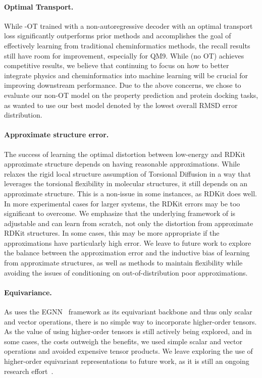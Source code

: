 \paragraph{Optimal Transport.} While \modelns-OT trained with a non-autoregressive decoder with an optimal transport loss significantly outperforms prior methods and accomplishes the goal of effectively learning from traditional cheminformatics methods, the recall results still have room for improvement, especially for QM9.
While \model (no OT) achieves competitive results, we believe that continuing to focus on how to better integrate physics and cheminformatics into machine learning will be crucial for improving downstream performance. Due to the above concerns, we chose to evaluate our non-OT model on the property prediction and protein docking tasks, as wanted to use our best model denoted by the lowest overall RMSD error distribution.


\paragraph{Approximate structure error.} 
The success of learning the optimal distortion between low-energy and RDKit approximate structure depends on having reasonable approximations.
While \model relaxes the rigid local structure assumption of Torsional Diffusion in a way that leverages the torsional flexibility in molecular structures, it still depends on an approximate structure. This is a non-issue in some instances, as RDKit does well. In more experimental cases for larger systems, the RDKit errors may be too significant to overcome. 
We emphasize that the underlying framework of \model is adjustable and can learn from scratch, not only the distortion from approximate RDKit structures. In some cases, this may be more appropriate if the approximations have particularly high error. 
We leave to future work to explore the balance between the approximation error and the inductive bias of learning from approximate structures, as well as methods to maintain flexibility while avoiding the issues of conditioning on out-of-distribution poor approximations.

\paragraph{Equivariance.} As \model uses the EGNN~\citep{EGNN} framework as its equivariant backbone and thus only scalar and vector operations, there is no simple way to incorporate higher-order tensors. As the value of using higher-order tensors is still actively being explored, and in some cases, the costs outweigh the benefits, we used simple scalar and vector operations and avoided expensive tensor products.
We leave exploring the use of higher-order equivariant representations to future work, as it is still an ongoing research effort~\citep{equivariance-survey}.